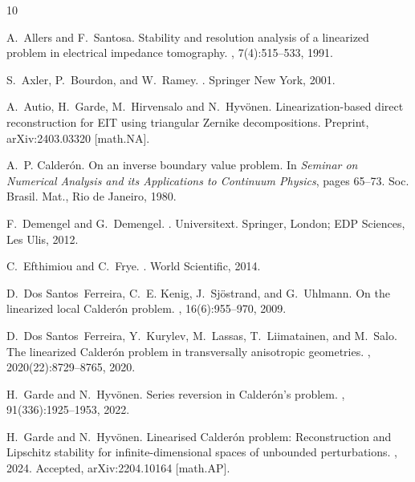 \documentclass[reqno]{amsart}
\numberwithin{equation}{section}
\numberwithin{figure}{section}
\numberwithin{table}{section}
\theoremstyle{plain}
\theoremstyle{definition}
\theoremstyle{remark}
\begin{document}

\begin{thebibliography}{10}
	
A.~Allers and F.~Santosa.
\newblock Stability and resolution analysis of a linearized problem in
electrical impedance tomography.
, 7(4):515--533, 1991.

S.~Axler, P.~Bourdon, and W.~Ramey.
.
\newblock Springer New York, 2001.

A.~Autio, H.~Garde, M.~Hirvensalo and N.~Hyv\"onen.
\newblock Linearization-based direct reconstruction for {EIT} using triangular {Z}ernike decompositions.
\newblock Preprint, arXiv:2403.03320 [math.NA].

A.~P. {C}alder{\'o}n.
\newblock On an inverse boundary value problem.
\newblock In {\em Seminar on {N}umerical {A}nalysis and its {A}pplications to
	{C}ontinuum {P}hysics}, pages 65--73. Soc. Brasil. Mat., Rio de Janeiro, 1980.

F.~Demengel and G.~Demengel.
.
\newblock Universitext. Springer, London; EDP Sciences, Les Ulis, 2012.

C.~Efthimiou and C.~Frye.
.
\newblock World Scientific, 2014.

D.~Dos Santos~Ferreira, C.~E. Kenig, J.~Sj\"{o}strand, and G.~Uhlmann.
\newblock On the linearized local {C}alder\'{o}n problem.
, 16(6):955--970, 2009.

D.~Dos Santos~Ferreira, Y.~Kurylev, M.~Lassas, T.~Liimatainen, and M.~Salo.
\newblock The linearized {C}alder\'{o}n problem in transversally anisotropic
geometries.
, 2020(22):8729--8765, 2020.

H.~Garde and N.~Hyv\"onen.
\newblock Series reversion in {C}alder\'on's problem.
, 91(336):1925--1953, 2022.

H.~Garde and N.~Hyvönen.
\newblock Linearised {C}alder{\'o}n problem: {R}econstruction and {L}ipschitz
stability for infinite-dimensional spaces of unbounded perturbations.
, 2024.
\newblock Accepted, arXiv:2204.10164 [math.AP].


\end{thebibliography}
\end{document}
